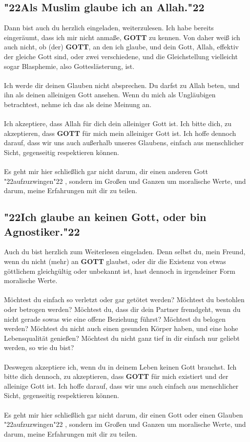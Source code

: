 \documentclass[12pt,a5paper]{article}
\newcommand{\Gott}[0]{\textbf{GOTT}}
\newcommand{\q}[1]{\char"22{#1}\char"22 }
\begin{document}
	\subsection{\q{Als Muslim glaube ich an Allah.}}
		Dann bist auch du herzlich eingeladen,
		weiterzulesen.
		Ich habe bereits einger\"aumt,
		dass ich mir nicht anma{\ss}e,
		{\Gott} zu kennen.
		Von daher wei{\ss} ich auch nicht,
		ob (der) {\Gott},
		an den ich glaube,
		und dein Gott,
		Allah,
		effektiv der gleiche Gott sind,
		oder zwei verschiedene,
		und die Gleichstellung vielleicht sogar Blasphemie,
		also Gottesl\"asterung,
		ist.
		\\
		\\
		Ich werde dir deinen Glauben nicht absprechen.
		Du darfst zu Allah beten,
		und ihn als deinen alleinigen Gott ansehen.
		Wenn du mich als Ungl\"aubigen betrachtest,
		nehme ich das als deine Meinung an.
		\\
		\\
		Ich akzeptiere,
		dass Allah f\"ur dich dein alleiniger Gott ist.
		Ich bitte dich,
		zu akzeptieren,
		dass {\Gott} f\"ur mich mein alleiniger Gott ist.
		Ich hoffe dennoch darauf,
		dass wir uns auch au{\ss}erhalb unseres Glaubens,
		einfach aus menschlicher Sicht,
		gegenseitig respektieren k\"onnen.
		\\
		\\
		Es geht mir hier schlie{\ss}lich gar nicht darum,
		dir einen anderen Gott \q{aufzuzwingen},
		sondern im Gro{\ss}en und Ganzen um moralische Werte,
		und darum,
		meine Erfahrungen mit dir zu teilen.
			
	\subsection{\q{Ich glaube an keinen Gott, oder bin Agnostiker.}}
		Auch du bist herzlich zum Weiterlesen eingeladen.
		Denn selbst du,
		mein Freund,
		wenn du nicht (mehr) an {\Gott} glaubst,
		oder dir die Existenz von etwas g\"ottlichem gleichg\"ultig oder unbekannt ist,
		hast dennoch in irgendeiner Form moralische Werte.
		\\
		\\
		M\"ochtest du einfach so verletzt oder gar get\"otet werden?
		M\"ochtest du bestohlen oder betrogen werden?
		M\"ochtest du,
		dass dir dein Partner fremdgeht,
		wenn du nicht gerade sowas wie eine offene Beziehung f\"uhrst?
		M\"ochtest du belogen werden?
		M\"ochtest du nicht auch einen gesunden K\"orper haben,
		und eine hohe Lebensqualit\"at genie{\ss}en?
		M\"ochtest du nicht ganz tief in dir einfach nur geliebt werden,
		so wie du bist?
		\\
		\\
		Deswegen akzeptiere ich,
		wenn du in deinem Leben keinen Gott brauchst.
		Ich bitte dich dennoch,
		zu akzeptieren,
		dass {\Gott} f\"ur mich existiert und der alleinige Gott ist.
		Ich hoffe darauf,
		dass wir uns auch einfach aus menschlicher Sicht,
		gegenseitig respektieren k\"onnen.
		\\
		\\
		Es geht mir hier schlie{\ss}lich gar nicht darum,
		dir einen Gott oder einen Glauben \q{aufzuzwingen},
		sondern im Gro{\ss}en und Ganzen um moralische Werte,
		und darum,
		meine Erfahrungen mit dir zu teilen.
		
\end{document}
